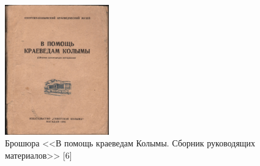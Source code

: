 \begin{figure}
    \begin{center}
    \includegraphics[width=0.4\textwidth]{authors/usupova-fig-1.jpg}
  \end{center}
  \caption{Брошюра <<В помощь краеведам Колымы. Сборник руководящих материалов>> [6]}
  \label{fig:usupova-fig-1}
\end{figure}
